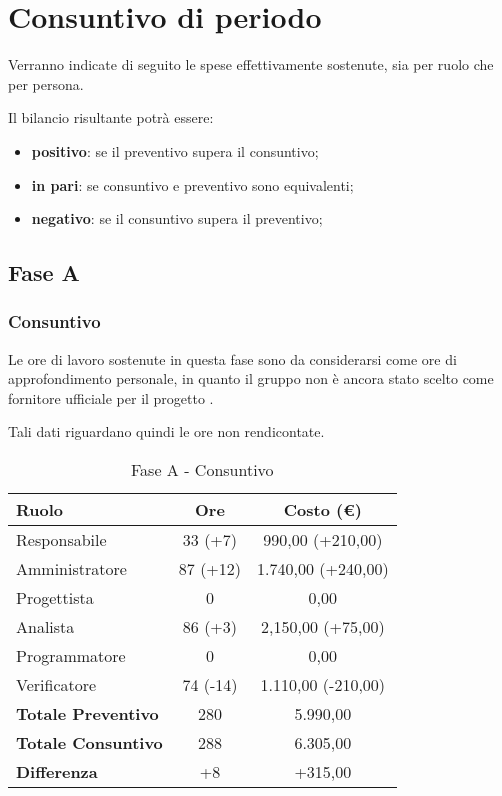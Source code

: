 \documentclass[../PianoProgetto.tex]{subfiles}
\begin{document}
\section{Consuntivo di periodo}
\label{sec:consuntivo}

	Verranno indicate di seguito le spese effettivamente sostenute, sia per ruolo che per persona.
	 
	Il bilancio risultante potrà essere: 
	\begin{itemize}
		\item \textbf{positivo}: se il preventivo supera il consuntivo;
		\item \textbf{in pari}: se consuntivo e preventivo sono equivalenti;
		\item \textbf{negativo}: se il consuntivo supera il preventivo;
	\end{itemize}

	\subsection{Fase A}
		\subsubsection{Consuntivo}
		Le ore di lavoro sostenute in questa fase sono da considerarsi come ore di approfondimento personale, in quanto il gruppo \leaf{} non è ancora stato scelto come fornitore ufficiale per il progetto \progetto.
		
		Tali dati riguardano quindi le ore non rendicontate.

		
\begin{table}[h]
		\centering
		\begin{tabular}{l * {2}{c}}
			\toprule
			\textbf{Ruolo} & \textbf{Ore} & \textbf{Costo (\euro{})} \\
			\midrule
			Responsabile &	33 (+7) & 990,00 (+210,00)\\
			Amministratore & 87 (+12) & 1.740,00 (+240,00)\\
			Progettista & 0 & 0,00 \\
			Analista & 86 (+3) & 2,150,00 (+75,00)\\
			Programmatore & 0 & 0,00 \\
			Verificatore & 74 (-14) & 1.110,00 (-210,00)\\
			\midrule
			\textbf{Totale Preventivo} & 280
 & 5.990,00
 \\		
			\textbf{Totale Consuntivo} & 288 & 6.305,00
 \\
			\midrule
			\textbf{Differenza} & +8 & +315,00 \\
			\bottomrule
		\end{tabular}
		
		\caption{Fase A - Consuntivo}
		\label{tab:consuntivoA}
		
	\end{table}		
		
\end{document}
